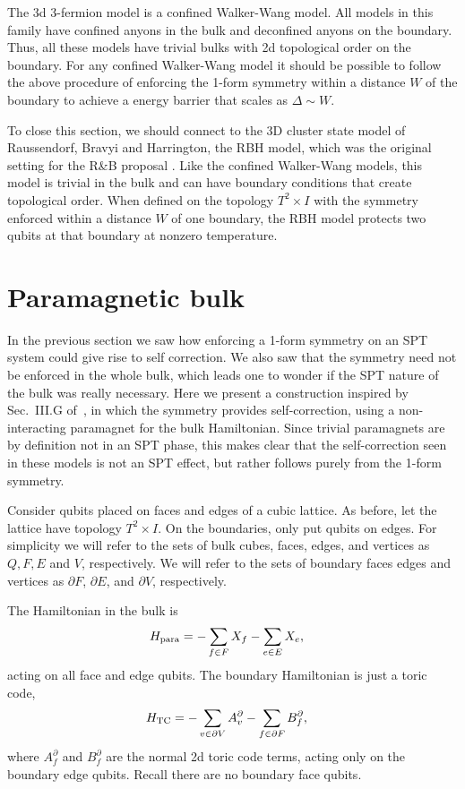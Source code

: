 The 3d 3-fermion model is a confined Walker-Wang model. All models in this family have confined anyons in the bulk and deconfined anyons on the boundary. Thus, all these models have trivial bulks with 2d topological order on the boundary. For any confined Walker-Wang model it should be possible to follow the above procedure of enforcing the 1-form symmetry within a distance $W$ of the boundary to achieve a energy barrier that scales as $\Delta\sim W$.

To close this section, we should connect to the 3D cluster state model of Raussendorf, Bravyi and Harrington, the RBH model, which was the original setting for the R\&B proposal \cite{RobertsBartlett2020}. Like the confined Walker-Wang models, this model is trivial in the bulk and can have boundary conditions that create topological order. When defined on the topology $T^2\times I$ with the symmetry enforced within a distance $W$ of one boundary, the RBH model protects two qubits at that boundary at nonzero temperature.

\section{Paramagnetic bulk} \label{sec:trivial}

In the previous section we saw how enforcing a 1-form symmetry on an SPT system could give rise to self correction. We also saw that the symmetry need not be enforced in the whole bulk, which leads one to wonder if the SPT nature of the bulk was really necessary. Here we present a construction inspired by Sec.~III.G of~\cite{RobertsBartlett2020}, in which the symmetry provides self-correction, using a non-interacting paramagnet for the bulk Hamiltonian. Since trivial paramagnets are by definition not in an SPT phase, this makes clear that the self-correction seen in these models is not an SPT effect, but rather follows purely from the 1-form symmetry.

Consider qubits placed on faces and edges of a cubic lattice. As before, let the lattice have topology $T^2\times I$. On the boundaries, only put qubits on edges. For simplicity we will refer to the sets of bulk cubes, faces, edges, and vertices as $Q, F, E$ and $V$, respectively. 
We will refer to the sets of boundary faces edges and vertices as $\partial F$, $\partial E$, and $\partial V$, respectively.

The Hamiltonian in the bulk is
\begin{align}
H_{\text{para}} &= -\sum_{f\in F}X_f - \sum_{e\in E}X_e,
\end{align}
acting on all face and edge qubits. The boundary Hamiltonian is just a toric code,
\begin{align}
H_{\text{TC}} &= -\sum_{v\in\partial V} A_v^\partial -\sum_{f\in\partial F}B^\partial_f,
\end{align}
where $A_f^\partial$ and $B_f^\partial$ are the normal 2d toric code terms, acting only on the boundary edge qubits. Recall there are no boundary face qubits.

